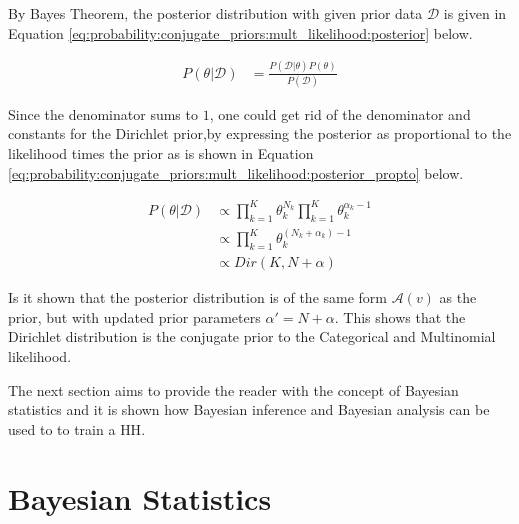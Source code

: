 By Bayes Theorem, the posterior distribution with given prior data $\mathcal{D}$ is given in Equation \ref{eq:probability:conjugate_priors:mult_likelihood:posterior} below.

\begin{equation}
      \label{eq:probability:conjugate_priors:mult_likelihood:posterior}
      \begin{split}
            P(\theta \vert \mathcal{D}) &= \frac{P(\mathcal{D} \vert \theta) P(\theta)}{P(\mathcal{D})}
      \end{split}
\end{equation}

Since the denominator sums to $1$, one could get rid of the denominator and constants for the Dirichlet prior,by expressing the posterior as proportional to the likelihood times the prior as is shown in Equation \ref{eq:probability:conjugate_priors:mult_likelihood:posterior_propto} below.

\begin{equation}
      \label{eq:probability:conjugate_priors:mult_likelihood:posterior_propto}
      \begin{split}
            P(\theta \vert \mathcal{D}) &\propto \prod_{k=1}^{K} \theta_{k}^{N_{k}} \prod_{k=1}^{K} \theta_{k}^{\alpha_{k} - 1}\\
            &\propto \prod_{k=1}^{K} \theta_{k}^{(N_{k} + \alpha_{k}) - 1} \\
            &\propto Dir(K, N + \alpha)
      \end{split}
\end{equation}

Is it shown that the posterior distribution is of the same form $\mathcal{A}(v)$ as the prior, but with updated prior parameters $\alpha' = N + \alpha$. This shows that the Dirichlet distribution is the conjugate prior to the Categorical and Multinomial likelihood.

The next section aims to provide the reader with the concept of Bayesian statistics and it is shown how Bayesian inference and Bayesian analysis can be used to to train a \ac{HH}.


\section{Bayesian Statistics}
\label{sec:probability:bayesian_statistics}

